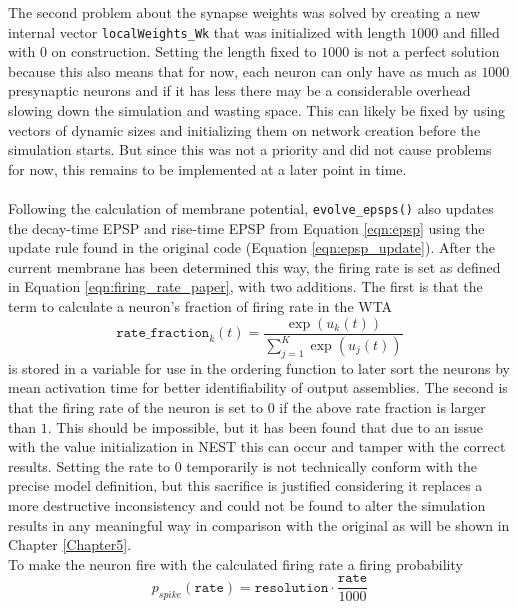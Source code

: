 The second problem about the synapse weights was solved by creating a new internal vector \texttt{localWeights\_Wk} that was initialized with length $1000$ and filled with $0$ on construction. Setting the length fixed to $1000$ is not a perfect solution because this also means that for now, each neuron can only have as much as $1000$ presynaptic neurons and if it has less there may be a considerable overhead slowing down the simulation and wasting space. This can likely be fixed by using vectors of dynamic sizes and initializing them on network creation before the simulation starts. But since this was not a priority and did not cause problems for now, this remains to be implemented at a later point in time.
\\ \ \\
Following the calculation of membrane potential, \texttt{evolve\_epsps()} also updates the decay-time EPSP and rise-time EPSP from Equation \ref{eqn:epsp} using the update rule found in the original code (Equation \ref{eqn:epsp_update}). After the current membrane has been determined this way, the firing rate is set as defined in Equation \ref{eqn:firing_rate_paper}, with two additions. The first is that the term to calculate a neuron's fraction of firing rate in the WTA
\begin{equation*}
    \texttt{rate\_fraction}_k(t)=\frac{\exp(u_k(t))}{\sum_{j=1}^K\exp(u_j(t))}
\end{equation*}
is stored in a variable for use in the ordering function to later sort the neurons by mean activation time for better identifiability of output assemblies. The second is that the firing rate of the neuron is set to $0$ if the above rate fraction is larger than $1$. This should be impossible, but it has been found that due to an issue with the value initialization in NEST this can occur and tamper with the correct results. Setting the rate to $0$ temporarily is not technically conform with the precise model definition, but this sacrifice is justified considering it replaces a more destructive inconsistency and could not be found to alter the simulation results in any meaningful way in comparison with the original as will be shown in Chapter \ref{Chapter5}.\\
To make the neuron fire with the calculated firing rate a firing probability
\begin{equation*}
    p_{spike}(\texttt{rate})=\texttt{resolution}\cdot \frac{\texttt{rate}}{1000}
\end{equation*}
